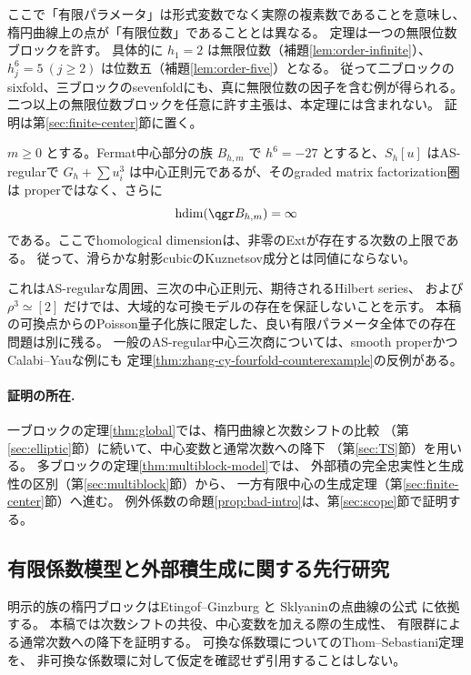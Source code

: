 ここで「有限パラメータ」は形式変数でなく実際の複素数であることを意味し、
楕円曲線上の点が「有限位数」であることとは異なる。
定理は一つの無限位数ブロックを許す。
具体的に \(h_1=2\) は無限位数（補題\ref{lem:order-infinite}）、
\(h_j^6=5\ (j\ge2)\) は位数五（補題\ref{lem:order-five}）となる。
従って二ブロックのsixfold、三ブロックのsevenfoldにも、真に無限位数の因子を含む例が得られる。
二つ以上の無限位数ブロックを任意に許す主張は、本定理には含まれない。
証明は第\ref{sec:finite-center}節に置く。

\begin{proposition}\label{prop:bad-intro}
 \(m\ge0\) とする。Fermat中心部分の族 \(B_{h,m}\) で \(h^6=-27\) とすると、\(S_h[u]\) はAS-regularで
 \(G_h+\sum u_i^3\) は中心正則元であるが、そのgraded matrix factorization圏は
 properではなく、さらに
 \[
 \operatorname{hdim}(\qgr B_{h,m})=\infty
 \]
 である。ここでhomological dimensionは、非零のExtが存在する次数の上限である。
 従って、滑らかな射影cubicのKuznetsov成分とは同値にならない。
\end{proposition}

これはAS-regularな周囲、三次の中心正則元、期待されるHilbert series、
および \(\rho^3\simeq[2]\) だけでは、大域的な可換モデルの存在を保証しないことを示す。
本稿の可換点からのPoisson量子化族に限定した、良い有限パラメータ全体での存在問題は別に残る。
一般のAS-regular中心三次商については、smooth properかつCalabi--Yauな例にも
定理\ref{thm:zhang-cy-fourfold-counterexample}の反例がある。

\paragraph{証明の所在.}
一ブロックの定理\ref{thm:global}では、楕円曲線と次数シフトの比較
（第\ref{sec:elliptic}節）に続いて、中心変数と通常次数への降下
（第\ref{sec:TS}節）を用いる。
多ブロックの定理\ref{thm:multiblock-model}では、
外部積の完全忠実性と生成性の区別（第\ref{sec:multiblock}節）から、
一方有限中心の生成定理（第\ref{sec:finite-center}節）へ進む。
例外係数の命題\ref{prop:bad-intro}は、第\ref{sec:scope}節で証明する。

\subsection{有限係数模型と外部積生成に関する先行研究}

明示的族の楕円ブロックはEtingof--Ginzburg \cite{EG} と
Sklyaninの点曲線の公式 \cite{Walton} に依拠する。
本稿では次数シフトの共役、中心変数を加える際の生成性、
有限群による通常次数への降下を証明する。
可換な係数環についてのThom--Sebastiani定理を、
非可換な係数環に対して仮定を確認せず引用することはしない。

